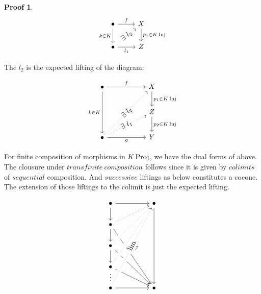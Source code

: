 \documentclass[a4paper]{article}
\theoremstyle{plain}
\theoremstyle{definition}
\newtheorem*{prf}{Proof}
\theoremstyle{remark}
\newcommand{\E}{\exists}
\DeclareMathOperator{\Proj}{\rm{Proj}}
\DeclareMathOperator{\Inj}{\rm{Inj}}
\begin{document}
\begin{prf}
            \[\begin{tikzcd}
                \bullet & X \\
                \bullet & Z
                \arrow["{ f}", from=1-1, to=1-2]
                \arrow["{p_1 \in K \Inj}", from=1-2, to=2-2]
                \arrow["{l_1}"', from=2-1, to=2-2]
                \arrow["{k \in K}"', from=1-1, to=2-1]
                \arrow["\E \ l_2"{marking}, dotted, from=2-1, to=1-2]
            \end{tikzcd}\]

            \par The $l_2$ is the expected lifting of the diagram:

            \[\begin{tikzcd}[row sep = 0.75cm, column sep = 0.95cm]
                \bullet && X \\
                && Z \\
                \bullet && Y
                \arrow["{k \in K}"', from=1-1, to=3-1]
                \arrow["g"', from=3-1, to=3-3]
                \arrow["f", from=1-1, to=1-3]
                \arrow["{p_1 \in K \Inj}", from=1-3, to=2-3]
                \arrow["{p_2\in K \Inj}", from=2-3, to=3-3]
                \arrow["{\E\ l_1}"{marking}, dotted, from=3-1, to=2-3]
                \arrow["{\E\ l_2}"{marking}, dotted, from=3-1, to=1-3]
            \end{tikzcd}\]

            \par For finite composition of morphisms in $K \Proj$, we have the dual forms of above.
            The clousure under $transfinite\ composition$ follows since it is given by
            $colimits$ of $sequential$ composition.
            And $successive$ liftings as below constitutes a cocone.
            The extension of those liftings to the colimit is just the expected lifting.

            \[\begin{tikzcd}
                \bullet && \bullet \\
                \bullet \\
                \bullet \\
                \bullet \\
                \bullet && \bullet
                \arrow[from=5-1, to=5-3]
                \arrow[from=1-3, to=5-3]
                \arrow[from=1-1, to=2-1]
                \arrow[from=2-1, to=3-1]
                \arrow["\cdots"{marking}, draw=none, from=4-1, to=5-1]
                \arrow[from=1-1, to=1-3]
                \arrow[from=3-1, to=5-3]
                \arrow[from=2-1, to=5-3]
                \arrow[dotted, from=2-1, to=1-3]
                \arrow[dotted, from=3-1, to=1-3, crossing over]
                \arrow[from=3-1, to=4-1]
                \arrow[dotted, from=4-1, to=1-3, crossing over]
                \arrow[from=4-1, to=5-3]
                \arrow["{\underset{\to}{\lim}}"{marking}, dotted, from=5-1, to=1-3, crossing over]
            \end{tikzcd}\]
        

\end{prf}
\end{document}
